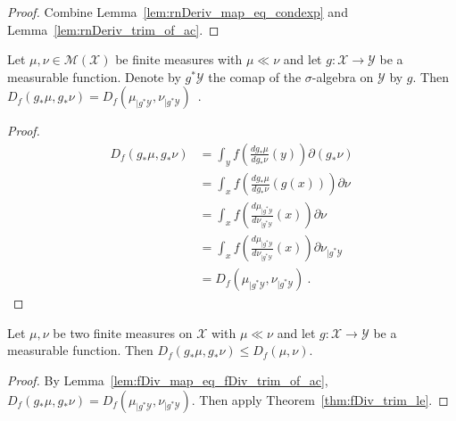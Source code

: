 \begin{proof}%
{}
Combine Lemma~\ref{lem:rnDeriv_map_eq_condexp} and Lemma~\ref{lem:rnDeriv_trim_of_ac}.
\end{proof}


\begin{lemma}
  \label{lem:fDiv_map_eq_fDiv_trim_of_ac}
  Let $\mu, \nu \in \mathcal M(\mathcal X)$ be finite measures with $\mu \ll \nu$ and let $g : \mathcal X \to \mathcal Y$ be a measurable function. Denote by $g^* \mathcal Y$ the comap of the $\sigma$-algebra on $\mathcal Y$ by $g$. Then
  $D_f(g_* \mu, g_* \nu) = D_f(\mu_{| g^* \mathcal Y}, \nu_{| g^* \mathcal Y})$~.
\end{lemma}

\begin{proof}%
{}
\begin{align*}
D_f(g_* \mu, g_* \nu)
&= \int_y f \left( \frac{d g_*\mu}{d g_*\nu}(y)\right) \partial(g_*\nu)
\\
&= \int_x f \left( \frac{d g_*\mu}{d g_*\nu}(g(x))\right) \partial\nu
\\
&= \int_x f \left(\frac{d \mu_{| g^* \mathcal Y}}{d \nu_{| g^* \mathcal Y}}(x) \right) \partial\nu
\\
&= \int_x f \left(\frac{d \mu_{| g^* \mathcal Y}}{d \nu_{| g^* \mathcal Y}}(x) \right) \partial\nu_{| g^* \mathcal Y}
\\
&= D_f(\mu_{| g^* \mathcal Y}, \nu_{| g^* \mathcal Y})
\: .
\end{align*}
\end{proof}


\begin{lemma}
  \label{lem:fDiv_map_le_of_ac}
  Let $\mu, \nu$ be two finite measures on $\mathcal X$ with $\mu \ll \nu$ and let $g : \mathcal X \to \mathcal Y$ be a measurable function. Then
  $D_f(g_* \mu, g_* \nu) \le D_f(\mu, \nu)$.
\end{lemma}

\begin{proof}%
{}
By Lemma~\ref{lem:fDiv_map_eq_fDiv_trim_of_ac},  $D_f(g_* \mu, g_* \nu) = D_f(\mu_{| g^* \mathcal Y}, \nu_{| g^* \mathcal Y})$. Then apply Theorem~\ref{thm:fDiv_trim_le}.
\end{proof}


